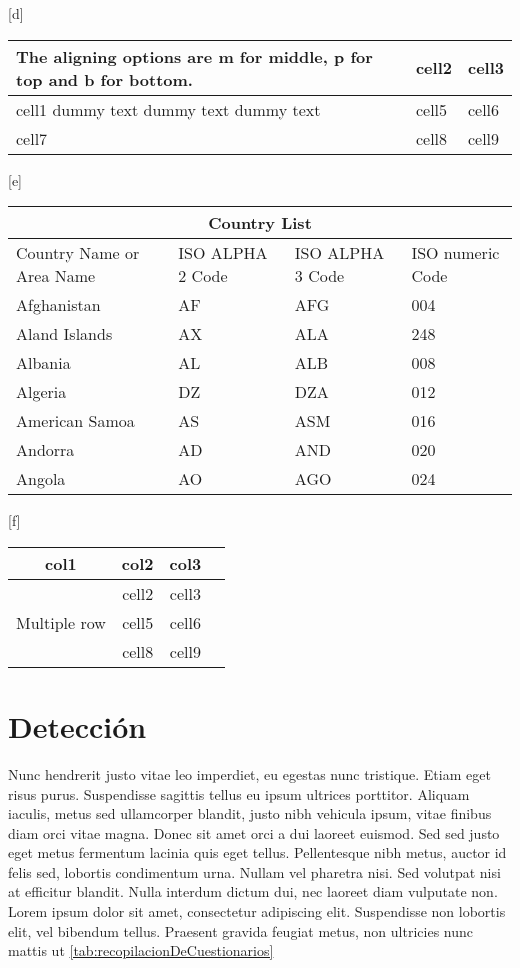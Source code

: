 \begin{center}[d]
\begin{tabular}{ | b{5cm} | m{2cm}| m{2cm} | } 
\hline
The aligning options are m for middle, p for top and b for bottom.& cell2 & cell3 \\ 
\hline
cell1 dummy text dummy text dummy text & cell5 & cell6 \\ 
\hline
cell7 & cell8 & cell9 \\ 
\hline
\end{tabular}
\end{center}

\begin{center}[e]
\begin{tabular}{ |p{3cm}||p{3cm}|p{3cm}|p{3cm}|  }
 \hline
 \multicolumn{4}{|c|}{Country List} \\
 \hline
 Country Name     or Area Name& ISO ALPHA 2 Code &ISO ALPHA 3 Code&ISO numeric Code\\
 \hline
 Afghanistan   & AF    &AFG&   004\\
 Aland Islands&   AX  & ALA   &248\\
 Albania &AL & ALB&  008\\
 Algeria    &DZ & DZA&  012\\
 American Samoa&   AS  & ASM&016\\
 Andorra& AD  & AND   &020\\
 Angola& AO  & AGO&024\\
 \hline
\end{tabular}
\end{center}


\begin{center}[f]
\begin{tabular}{ |c|c|c|c| } 
\hline
col1 & col2 & col3 \\
\hline
\multirow{3}{4em}{Multiple row} & cell2 & cell3 \\ 
& cell5 & cell6 \\ 
& cell8 & cell9 \\ 
\hline
\end{tabular}
\end{center}

\section{Detección}
Nunc hendrerit justo vitae leo imperdiet, eu egestas nunc tristique. Etiam eget risus purus. Suspendisse sagittis tellus eu ipsum ultrices porttitor. Aliquam iaculis, metus sed ullamcorper blandit, justo nibh vehicula ipsum, vitae finibus diam orci vitae magna. Donec sit amet orci a dui laoreet euismod. Sed sed justo eget metus fermentum lacinia quis eget tellus. Pellentesque nibh metus, auctor id felis sed, lobortis condimentum urna. Nullam vel pharetra nisi. Sed volutpat nisi at efficitur blandit. Nulla interdum dictum dui, nec laoreet diam vulputate non. Lorem ipsum dolor sit amet, consectetur adipiscing elit. Suspendisse non lobortis elit, vel bibendum tellus. Praesent gravida feugiat metus, non ultricies nunc mattis ut \ref{tab:recopilacionDeCuestionarios}



